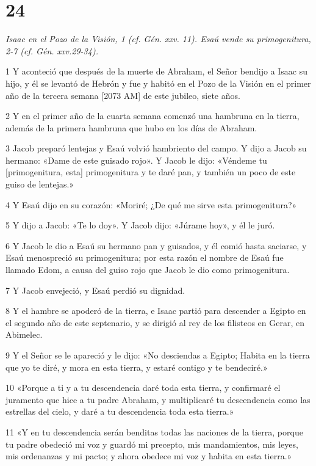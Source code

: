 \chapter{24}

\par \textit{Isaac en el Pozo de la Visión, 1 (cf. Gén. xxv. 11). Esaú vende su primogenitura, 2-7 (cf. Gén. xxv.29-34).}

\par 1 Y aconteció que después de la muerte de Abraham, el Señor bendijo a Isaac su hijo, y él se levantó de Hebrón y fue y habitó en el Pozo de la Visión en el primer año de la tercera semana [2073 AM] de este jubileo, siete años.
\par 2 Y en el primer año de la cuarta semana comenzó una hambruna en la tierra, además de la primera hambruna que hubo en los días de Abraham.
\par 3 Jacob preparó lentejas y Esaú volvió hambriento del campo. Y dijo a Jacob su hermano: «Dame de este guisado rojo». Y Jacob le dijo: «Véndeme tu [primogenitura, esta] primogenitura y te daré pan, y también un poco de este guiso de lentejas.»
\par 4 Y Esaú dijo en su corazón: «Moriré; ¿De qué me sirve esta primogenitura?»
\par 5 Y dijo a Jacob: «Te lo doy». Y Jacob dijo: «Júrame hoy», y él le juró.
\par 6 Y Jacob le dio a Esaú su hermano pan y guisados, y él comió hasta saciarse, y Esaú menospreció su primogenitura; por esta razón el nombre de Esaú fue llamado Edom, a causa del guiso rojo que Jacob le dio como primogenitura.
\par 7 Y Jacob envejeció, y Esaú perdió su dignidad.
\par 8 Y el hambre se apoderó de la tierra, e Isaac partió para descender a Egipto en el segundo año de este septenario, y se dirigió al rey de los filisteos en Gerar, en Abimelec.
\par 9 Y el Señor se le apareció y le dijo: «No desciendas a Egipto; Habita en la tierra que yo te diré, y mora en esta tierra, y estaré contigo y te bendeciré.»
\par 10 «Porque a ti y a tu descendencia daré toda esta tierra, y confirmaré el juramento que hice a tu padre Abraham, y multiplicaré tu descendencia como las estrellas del cielo, y daré a tu descendencia toda esta tierra.»
\par 11 «Y en tu descendencia serán benditas todas las naciones de la tierra, porque tu padre obedeció mi voz y guardó mi precepto, mis mandamientos, mis leyes, mis ordenanzas y mi pacto; y ahora obedece mi voz y habita en esta tierra.»
